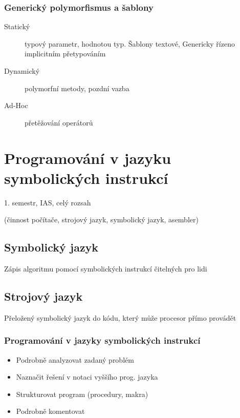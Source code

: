 \documentclass[a4paper, 11pt]{report}
\begin{document}
\subsection{Generický polymorfismus a šablony}
\begin{description} 
	\item[Statický] typový parametr, hodnotou typ. Šablony textové, Genericky řízeno implicitním přetypováním
	\item[Dynamický] polymorfní metody, pozdní vazba
	\item[Ad-Hoc] přetěžování operátorů
\end{description}





























\chapter{Programování v jazyku symbolických instrukcí} \label{cha:37}

1. semestr, IAS, celý rozsah

(činnost počítače, strojový jazyk, symbolický jazyk, asembler)

\section{Symbolický jazyk}

Zápis algoritmu pomocí symbolických instrukcí čitelných pro lidi

\section{Strojový jazyk}

Přeložený symbolický jazyk do kódu, který může procesor přímo provádět

\subsection{Programování v jazyky symbolických instrukcí}
\begin{itemize}
	\item Podrobně analyzovat zadaný problém
	\item Naznačit řešení v notaci vyššího prog. jazyka
	\item Strukturovat program (procedury, makra)
	\item Podrobně komentovat
\end{itemize}
\end{document}
